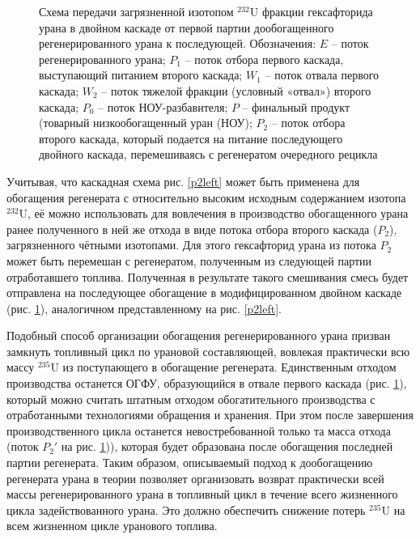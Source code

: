 \begin{figure}[ht]
    \caption{Схема передачи загрязненной изотопом $^{232}$U фракции гексафторида урана в двойном каскаде от первой партии дообогащенного регенерированного урана к последующей. Обозначения: $E$ -- поток регенерированного урана; $P_1$ -- поток отбора первого каскада, выступающий питанием второго каскада; $W_1$ -- поток отвала первого каскада; $W_2$ -- поток тяжелой фракции (условный «отвал») второго каскада; $P_0$ -- поток НОУ-разбавителя; $P$ -- финальный продукт (товарный низкообогащенный уран (НОУ); $P_2$ -- поток отбора второго каскада, который подается на питание последующего двойного каскада, перемешиваясь с регенератом очередного рецикла}\label{P2utilizationRing}
\end{figure}

Учитывая, что каскадная схема рис. \ref{p2left} может быть применена для обогащения регенерата с относительно высоким исходным содержанием изотопа $^{232}$U, её можно использовать для вовлечения в производство обогащенного урана ранее полученного в ней же отхода в виде потока отбора второго каскада ($P_2$), загрязненного чётными изотопами. Для этого гексафторид урана из потока $P_2$ может быть перемешан с регенератом, полученным из следующей партии отработавшего топлива. Полученная в результате такого смешивания смесь будет отправлена на последующее обогащение в модифицированном двойном каскаде (рис. \ref{P2utilizationRing}), аналогичном представленному на рис. \ref{p2left}.

Подобный способ организации обогащения регенерированного урана призван замкнуть топливный цикл по урановой составляющей, вовлекая практически всю массу $^{235}$U из поступающего в обогащение регенерата. Единственным отходом производства останется ОГФУ, образующийся в отвале первого каскада (рис. \ref{P2utilizationRing}), который можно считать штатным отходом обогатительного производства с отработанными технологиями обращения и хранения. При этом после завершения производственного цикла останется невостребованной только та масса отхода (поток ${P_2}'$ на рис. \ref{P2utilizationRing})), которая будет образована после обогащения последней партии регенерата. Таким образом, описываемый подход к дообогащению регенерата урана в теории позволяет организовать возврат практически всей массы регенерированного урана в топливный цикл в течение всего жизненного цикла задействованного урана. Это должно обеспечить снижение потерь $^{235}$U на всем жизненном цикле уранового топлива.

